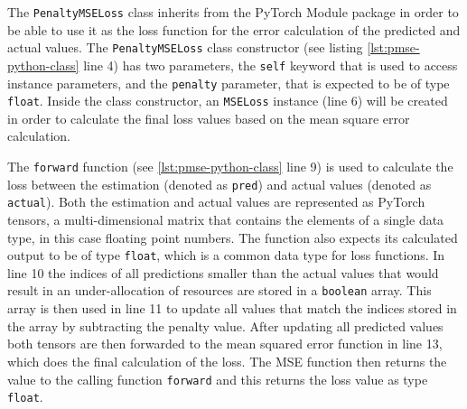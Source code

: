   The \texttt{PenaltyMSELoss} class inherits from the PyTorch Module package in order to be able to use it as the loss function for the error calculation of the predicted and actual values.
  The \texttt{PenaltyMSELoss} class constructor (see listing \ref{lst:pmse-python-class} line 4) has two parameters, the \texttt{self} keyword that is used to access instance parameters, and the \texttt{penalty} parameter, that is expected to be of type \texttt{float}.
  Inside the class constructor, an \texttt{MSELoss} instance (line 6) will be created in order to calculate the final loss values based on the mean square error calculation.

  

  The \texttt{forward} function (see \ref{lst:pmse-python-class} line 9) is used to calculate the loss between the estimation (denoted as \texttt{pred}) and actual values (denoted as \texttt{actual}). Both the estimation and actual values are represented as PyTorch tensors, a multi-dimensional matrix that contains the elements of a single data type, in this case floating point numbers.
  The function also expects its calculated output to be of type \texttt{float}, which is a common data type for loss functions.
  In line 10 the indices of all predictions smaller than the actual values that would result in an under-allocation of resources are stored in a \texttt{boolean} array.
  This array is then used in line 11 to update all values that match the indices stored in the array by subtracting the penalty value.
  After updating all predicted values both tensors are then forwarded to the mean squared error function in line 13, which does the final calculation of the loss.
  The MSE function then returns the value to the calling function \texttt{forward} and this returns the loss value as type \texttt{float}.




